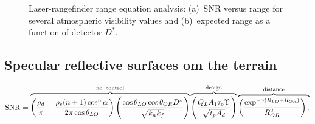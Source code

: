 \begin{figure}[tb]
\centering
{}
\caption
{\label{kamif}Laser-rangefinder range equation analysis: (a)~SNR versus range for several atmospheric visibility values and (b)~expected range as a function of detector $D^\ast$.}
\end{figure}




\subsection{Specular reflective surfaces om the terrain}

\begin{equation}
\operatorname{SNR}=
\overbrace{\left(\frac{\rho_d}{\pi} + \frac{\rho_s(n+1)\cos^n\alpha}{2\pi\cos\theta_{LO}}\right)
\left(\frac{  \cos\theta_{LO} \cos\theta_{OR} D^\ast }{\sqrt{k_nk_f}}\right)
}^{\rm no\;\;control}
\overbrace{
\left(\frac{Q_L A_1 \tau_o \Upsilon}{\sqrt{t_p A_d}}\right)
}^{\rm design}
\overbrace{
\left(\frac{\exp^{-\gamma (R_{LO}+R_{OR})} }{R^2_{OR}}\right).\\
}^{\rm distance}
\label{lrfd2e}
\end{equation}


